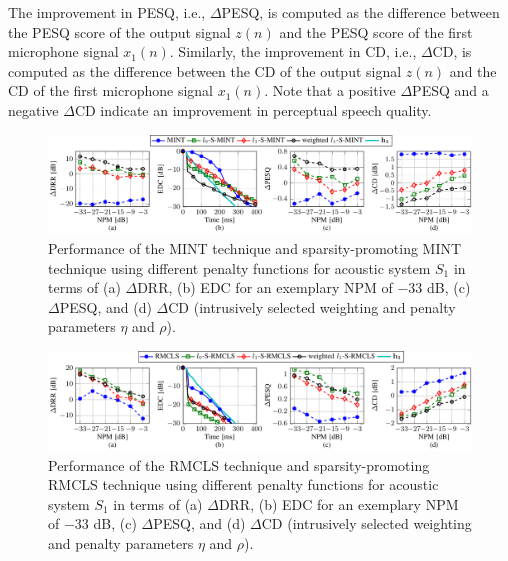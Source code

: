 \documentclass[10pt]{IEEEtran}
\begin{document}
The improvement in PESQ, i.e., $\Delta$PESQ, is computed as the difference between the PESQ score of the output signal $z(n)$ and the PESQ score of the first microphone signal $x_1(n)$.
Similarly, the improvement in CD, i.e., $\Delta$CD, is computed as the difference between the CD of the output signal $z(n)$ and the CD of the first microphone signal $x_1(n)$.
Note that a positive $\Delta$PESQ and a negative $\Delta$CD indicate an improvement in perceptual speech quality.
\begin{figure}[t!]
\centering
\includegraphics[scale=0.9]{Plots/perf_mint}
\caption{Performance of the MINT technique and sparsity-promoting MINT technique using different penalty functions for acoustic system $S_1$ in terms of (a) $\Delta$DRR, (b) EDC for an exemplary NPM of $-33$ dB, (c) $\Delta$PESQ, and (d) $\Delta$CD (intrusively selected weighting and penalty parameters $\eta$ and $\rho$).}
\label{fig: perf_mint}
\end{figure}
\begin{figure}[t!]
\centering
\includegraphics[scale=0.9]{Plots/perf_rmcls}
\caption{Performance of the RMCLS technique and sparsity-promoting RMCLS technique using different penalty functions for acoustic system $S_1$ in terms of (a) $\Delta$DRR, (b) EDC for an exemplary NPM of $-33$ dB, (c) $\Delta$PESQ, and (d) $\Delta$CD (intrusively selected weighting and penalty parameters $\eta$ and $\rho$).}
\label{fig: perf_rmcls}
\end{figure}
\end{document}
